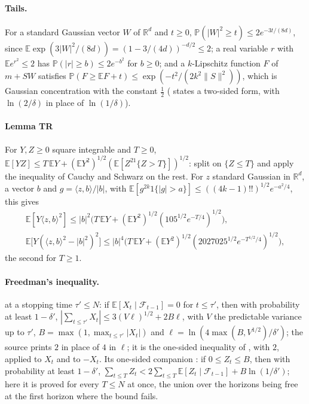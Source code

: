\documentclass[11pt]{amsart}
\theoremstyle{definition}
\numberwithin{equation}{section}
\newcommand{\R}{\mathbb{R}}
\newcommand{\E}{\mathbb{E}}
\newcommand{\Prob}{\mathbb{P}}
\newcommand{\cF}{\mathscr{F}}
\newcommand{\ip}[1]{\langle #1\rangle}
\begin{document}
\paragraph{Tails.} For a standard Gaussian vector $W$ of $\R^d$ and $t\ge0$, $\Prob(|W|^2\ge t)\le2e^{-3t/(8d)}$, since $\E\exp(3|W|^2/(8d))=(1-3/(4d))^{-d/2}\le2$; a real variable $r$ with $\E e^{r^2}\le2$ has $\Prob(|r|\ge b)\le2e^{-b^2}$ for $b\ge0$; and a $k$-Lipschitz function $F$ of $m+SW$ satisfies $\Prob(F\ge\E F+t)\le\exp(-t^2/(2k^2\|S\|^2))$, which is Gaussian concentration with the constant $\frac12$ \cite[Theorem~1A and Corollary~1]{TIS76} (\cite[Theorem~B.16]{Lat24} states a two-sided form, with $\ln(2/\delta)$ in place of $\ln(1/\delta)$).

\paragraph{Lemma TR} For $Y,Z\ge0$ square integrable and $T\ge0$, $\E[YZ]\le T\,\E Y+(\E Y^2)^{1/2}(\E[Z^21\{Z>T\}])^{1/2}$: split on $\{Z\le T\}$ and apply the inequality of Cauchy and Schwarz on the rest. For $z$ standard Gaussian in $\R^d$, a vector $b$ and $g=\ip{z,b}/|b|$, with $\E[g^{2k}1\{|g|>a\}]\le((4k-1)!!)^{1/2}e^{-a^2/4}$, this gives
\begin{gather*}
\E[Y\ip{z,b}^2]\le|b|^2\bigl(T\,\E Y+(\E Y^2)^{1/2}(105^{1/2}e^{-T/4})^{1/2}\bigr),\\
\E\bigl[Y(\ip{z,b}^2-|b|^2)^2\bigr]\le|b|^4\bigl(T\,\E Y+(\E Y^2)^{1/2}(2027025^{1/2}e^{-T^{1/2}/4})^{1/2}\bigr),
\end{gather*}
the second for $T\ge1$.

\paragraph{Freedman's inequality.} \cite[Theorem~B.20]{Lat24} at a stopping time $\tau'\le N$: if $\E[X_t\mid\cF_{t-1}]=0$ for $t\le\tau'$, then with probability at least $1-\delta'$, $|\sum_{t\le\tau'}X_t|\le3(V\ell)^{1/2}+2B\ell$, with $V$ the predictable variance up to $\tau'$, $B=\max(1,\max_{t\le\tau'}|X_t|)$ and $\ell=\ln(4\max(B,V^{1/2})/\delta')$; the source prints $2$ in place of $4$ in $\ell$; it is the one-sided inequality of \cite[Theorem~9]{ZL22}, with $2$, applied to $X_t$ and to $-X_t$. Its one-sided companion \cite[Theorem~B.22]{Lat24}: if $0\le Z_t\le B$, then with probability at least $1-\delta'$, $\sum_{t\le T}Z_t<2\sum_{t\le T}\E[Z_t\mid\cF_{t-1}]+B\ln(1/\delta')$; here it is proved for every $T\le N$ at once, the union over the horizons being free at the first horizon where the bound fails.
\end{document}
